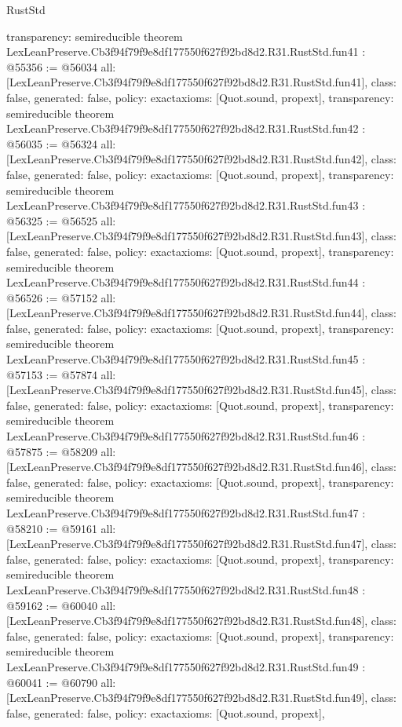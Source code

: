 \begin{lexlean}{RustStd}
\begin{coremodule}
{  transparency: semireducible
}
theorem LexLeanPreserve.Cb3f94f79f9e8df177550f627f92bd8d2.R31.RustStd.fun41 : @55356 := @56034 {
  all: [LexLeanPreserve.Cb3f94f79f9e8df177550f627f92bd8d2.R31.RustStd.fun41],
  class: false,
  generated: false,
  policy: exact{axioms: [Quot.sound, propext]},
  transparency: semireducible
}
theorem LexLeanPreserve.Cb3f94f79f9e8df177550f627f92bd8d2.R31.RustStd.fun42 : @56035 := @56324 {
  all: [LexLeanPreserve.Cb3f94f79f9e8df177550f627f92bd8d2.R31.RustStd.fun42],
  class: false,
  generated: false,
  policy: exact{axioms: [Quot.sound, propext]},
  transparency: semireducible
}
theorem LexLeanPreserve.Cb3f94f79f9e8df177550f627f92bd8d2.R31.RustStd.fun43 : @56325 := @56525 {
  all: [LexLeanPreserve.Cb3f94f79f9e8df177550f627f92bd8d2.R31.RustStd.fun43],
  class: false,
  generated: false,
  policy: exact{axioms: [Quot.sound, propext]},
  transparency: semireducible
}
theorem LexLeanPreserve.Cb3f94f79f9e8df177550f627f92bd8d2.R31.RustStd.fun44 : @56526 := @57152 {
  all: [LexLeanPreserve.Cb3f94f79f9e8df177550f627f92bd8d2.R31.RustStd.fun44],
  class: false,
  generated: false,
  policy: exact{axioms: [Quot.sound, propext]},
  transparency: semireducible
}
theorem LexLeanPreserve.Cb3f94f79f9e8df177550f627f92bd8d2.R31.RustStd.fun45 : @57153 := @57874 {
  all: [LexLeanPreserve.Cb3f94f79f9e8df177550f627f92bd8d2.R31.RustStd.fun45],
  class: false,
  generated: false,
  policy: exact{axioms: [Quot.sound, propext]},
  transparency: semireducible
}
theorem LexLeanPreserve.Cb3f94f79f9e8df177550f627f92bd8d2.R31.RustStd.fun46 : @57875 := @58209 {
  all: [LexLeanPreserve.Cb3f94f79f9e8df177550f627f92bd8d2.R31.RustStd.fun46],
  class: false,
  generated: false,
  policy: exact{axioms: [Quot.sound, propext]},
  transparency: semireducible
}
theorem LexLeanPreserve.Cb3f94f79f9e8df177550f627f92bd8d2.R31.RustStd.fun47 : @58210 := @59161 {
  all: [LexLeanPreserve.Cb3f94f79f9e8df177550f627f92bd8d2.R31.RustStd.fun47],
  class: false,
  generated: false,
  policy: exact{axioms: [Quot.sound, propext]},
  transparency: semireducible
}
theorem LexLeanPreserve.Cb3f94f79f9e8df177550f627f92bd8d2.R31.RustStd.fun48 : @59162 := @60040 {
  all: [LexLeanPreserve.Cb3f94f79f9e8df177550f627f92bd8d2.R31.RustStd.fun48],
  class: false,
  generated: false,
  policy: exact{axioms: [Quot.sound, propext]},
  transparency: semireducible
}
theorem LexLeanPreserve.Cb3f94f79f9e8df177550f627f92bd8d2.R31.RustStd.fun49 : @60041 := @60790 {
  all: [LexLeanPreserve.Cb3f94f79f9e8df177550f627f92bd8d2.R31.RustStd.fun49],
  class: false,
  generated: false,
  policy: exact{axioms: [Quot.sound, propext]},
}
\end{coremodule}
\end{lexlean}
